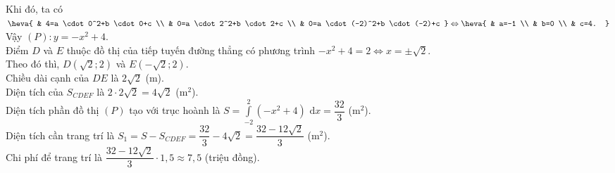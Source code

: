 \begin{ex}
{Khi đó, ta có
$\heva{
& 4=a \cdot 0^2+b \cdot 0+c \\
& 0=a \cdot 2^2+b \cdot 2+c \\
& 0=a \cdot (-2)^2+b \cdot (-2)+c
}
\Leftrightarrow
\heva{
& a=-1 \\
& b=0 \\
& c=4.
}$\\
Vậy $(P)\colon y=-x^2+4$.\\
Điểm $D$ và $E$ thuộc đồ thị của tiếp tuyến đường thẳng có phương trình $-x^2+4=2 \Leftrightarrow x=\pm \sqrt{2}$.\\ Theo đó thì, $D(\sqrt{2};2)$ và $E(-\sqrt{2};2)$.\\
Chiều dài cạnh của $DE$ là $2\sqrt{2}$ (m).\\
Diện tích của $S_{CDEF}$ là $2 \cdot 2\sqrt{2}=4\sqrt{2}$ (m$^2$).\\
Diện tích phần đồ thị $(P)$ tạo với trục hoành là $S=\displaystyle\int\limits_{-2}^2 (-x^2+4) \, \mathrm{\,d}x=\dfrac{32}{3}$ (m$^2$).\\
Diện tích cần trang trí là $S_1=S-S_{CDEF}=\dfrac{32}{3}-4\sqrt{2}=\dfrac{32-12\sqrt{2}}{3}$ (m$^2$).\\
Chi phí để trang trí là $\dfrac{32-12\sqrt{2}}{3} \cdot 1{,}5 \approx 7{,}5$ (triệu đồng).
}
\end{ex}

